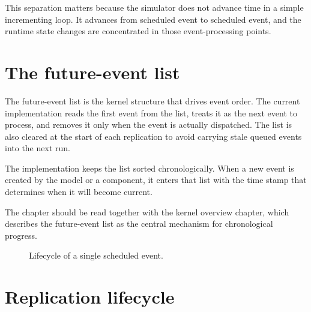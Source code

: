 This separation matters because the simulator does not advance time in a simple
incrementing loop. It advances from scheduled event to scheduled event, and the
runtime state changes are concentrated in those event-processing points.

\section{The future-event list}
\label{sec:event-scheduling-future-event-list}

The future-event list is the kernel structure that drives event order. The
current implementation reads the first event from the list, treats it as the
next event to process, and removes it only when the event is actually
dispatched. The list is also cleared at the start of each replication to avoid
carrying stale queued events into the next run.

The implementation keeps the list sorted chronologically. When a new event is
created by the model or a component, it enters that list with the time stamp
that determines when it will become current.

The chapter should be read together with the kernel overview chapter, which
describes the future-event list as the central mechanism for chronological
progress.

\begin{figure}[htbp]
\centering
\caption{Lifecycle of a single scheduled event.}
\label{fig:event-scheduling-lifecycle}
\end{figure}

\section{Replication lifecycle}
\label{sec:event-scheduling-replication-lifecycle}

